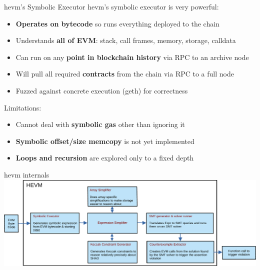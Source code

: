 \documentclass[aspectratio=169]{beamer}
\begin{document}
\begin{frame}{hevm's Symbolic Executor}
hevm's symbolic executor is very powerful:
\begin{itemize}
\item \textbf{Operates on bytecode} so runs everything deployed to the chain
\item Understands \textbf{all of EVM}: stack, call frames, memory, storage, calldata
\item Can run on any \textbf{point in blockchain history} via RPC to an archive node
\item Will pull all required \textbf{contracts} from the chain via RPC to a full node
\item Fuzzed against concrete execution (geth) for correctness
\end{itemize}
\bigskip

Limitations:
\begin{itemize}
\item Cannot deal with \textbf{symbolic gas} other than ignoring it
\item \textbf{Symbolic offset/size memcopy} is not yet implemented
\item \textbf{Loops and recursion} are explored only to a fixed depth
\end{itemize}
\end{frame}

\begin{frame}{hevm internals}
\centering
\includegraphics[scale=0.6]{hevm-overview}
\end{frame}
\end{document}
